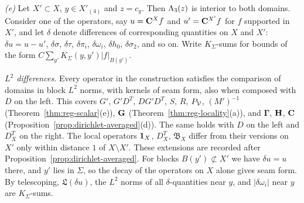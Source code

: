 \emph{(e)} Let $X'\subset X$, $y\in X'_{(4)}$ and $z=c_y$. Then $\Lambda_3(z)$ is interior to both domains. Consider one of the operators, say $u=\mathbf C^Xf$ and $u'=\mathbf C^{X'}f$ for $f$ supported in $X'$, and let $\delta$ denote differences of corresponding quantities on $X$ and $X'$: $\delta u=u-u'$, $\delta\sigma$, $\delta\tau$, $\delta\pi_i$, $\delta\omega_i$, $\delta h_0$, $\delta\sigma_2$, and so on. Write $K_\Sigma$-sums for bounds of the form $C\sum_{y'}K_\Sigma(y,y')|f|_{B(y')}$.

\emph{$L^2$ differences.} Every operator in the construction satisfies the comparison of domains in block $L^2$ norms, with kernels of seam form, also when composed with $D$ on the left. This covers $G'$, $G'D^T$, $DG'D^T$, $S$, $R$, $P_\mathcal V$, $(M')^{-1}$ (Theorem~\ref{thm:reg-scalar}(e)), $\mathbf G$ (Theorem~\ref{thm:reg-locality}(a)), and $\boldsymbol\Gamma$, $\mathbf H$, $\mathbf C$ (Proposition~\ref{prop:dirichlet-averaged}(d)). The same holds with $D$ on the left and $D^T_X$ on the right. The local operators $\mathbf 1_X$, $D^T_X$, $\mathfrak B_X$ differ from their versions on $X'$ only within distance $1$ of $X\setminus X'$. These extensions are recorded after Proposition~\ref{prop:dirichlet-averaged}. For blocks $B(y')\not\subset X'$ we have $\delta u=u$ there, and $y'$ lies in $\Sigma$, so the decay of the operators on $X$ alone gives seam form. By telescoping, $\mathfrak L(\delta u)$, the $L^2$ norms of all $\delta$-quantities near $y$, and $|\delta\omega_i|$ near $y$ are $K_\Sigma$-sums.

